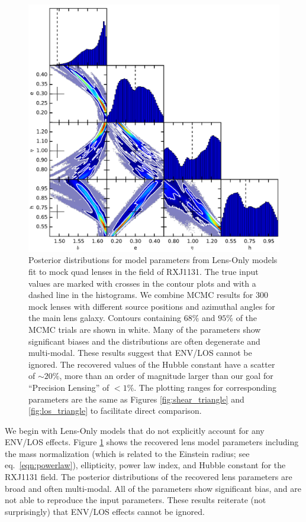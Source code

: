 \documentclass{emulateapj}
\begin{document}
\begin{figure}[ht]
\begin{center}
\includegraphics[width=1\textwidth]{all_none_1e-2.pdf}
\caption{\label{fig:none_triangle} Posterior distributions for model parameters from Lens-Only models fit to mock quad lenses in the field of RXJ1131. The true input values are marked with crosses in the contour plots and with a dashed line in the histograms. We combine MCMC results for 300 mock lenses with different source positions and azimuthal angles for the main lens galaxy.  Contours containing $68\%$ and $95\%$ of the MCMC trials are shown in white. Many of the parameters show significant biases and the distributions are often degenerate and multi-modal. These results suggest that ENV/LOS cannot be ignored. The recovered values of the Hubble constant have a scatter of $\sim 20\%$, more than an order of magnitude larger than our goal for ``Precision Lensing'' of $<1\%$. The plotting ranges for corresponding parameters are the same as Figures \ref{fig:shear_triangle} and \ref{fig:los_triangle} to facilitate direct comparison.
}
\end{center}
\end{figure}

We begin with Lens-Only models that do not explicitly account for any ENV/LOS effects. Figure \ref{fig:none_triangle} shows the recovered lens model parameters including the mass normalization (which is related to the Einstein radius; see eq.\ \ref{eqn:powerlaw}), ellipticity, power law index, and Hubble constant for the RXJ1131 field. The posterior distributions of the recovered lens parameters are broad and often multi-modal. All of the parameters show significant bias, and are not able to reproduce the input parameters. These results reiterate (not surprisingly) that ENV/LOS effects cannot be ignored.
\end{document}
